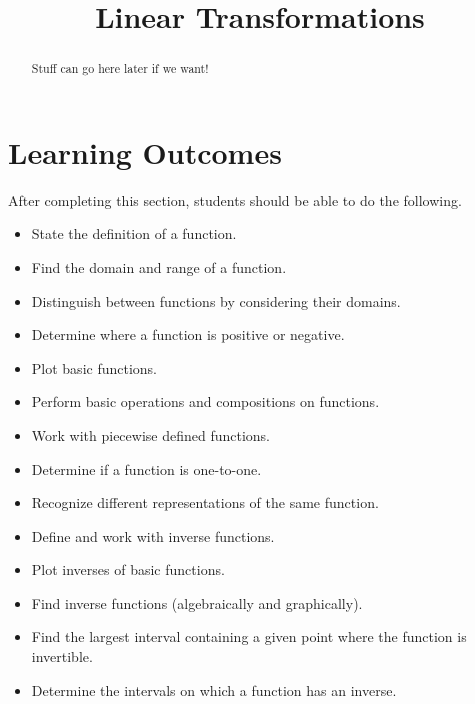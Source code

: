 \documentclass{ximera}
\title{Linear Transformations}
\begin{document}
\begin{abstract}
Stuff can go here later if we want!
\end{abstract}
 
\maketitle
 
\section*{Learning Outcomes}
After completing this section, students should be able to do the following.
 
\begin{itemize}
    \item State the definition of a function.
    \item Find the domain and range of a function.
    \item Distinguish between functions by considering their domains.
    \item Determine where a function is positive or negative.
    \item Plot basic functions.
        \item Perform basic operations and compositions on
          functions.
        \item Work with piecewise defined functions.
    \item Determine if a function is one-to-one.
    \item Recognize different representations of the same function.
        \item Define and work with inverse functions.
        \item Plot inverses of basic functions.
    \item Find inverse functions (algebraically and graphically).
        \item Find the largest interval containing a given point
          where the function is invertible.
    \item Determine the intervals on which a function has an inverse.
 
\end{itemize}

 
\end{document}
